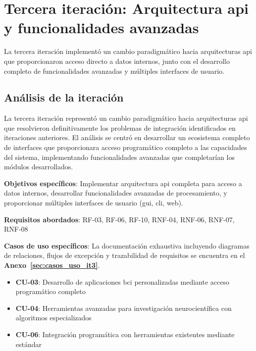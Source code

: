 \section{Tercera iteración: Arquitectura \acrshort{api} y funcionalidades avanzadas}
\label{sec:iteracion_3}

La tercera iteración implementó un cambio paradigmático hacia arquitecturas \acrshort{api} que proporcionaron acceso directo a datos internos, junto con el desarrollo completo de funcionalidades avanzadas y múltiples interfaces de usuario.

\subsection{Análisis de la iteración}
\label{subsec:analisis_iteracion_3}

La tercera iteración representó un cambio paradigmático hacia arquitecturas \acrshort{api} que resolvieron definitivamente los problemas de integración identificados en iteraciones anteriores. El análisis se centró en desarrollar un ecosistema completo de interfaces que proporcionara acceso programático completo a las capacidades del sistema, implementando funcionalidades avanzadas que completarían los módulos desarrollados.

\textbf{Objetivos específicos}: Implementar arquitectura \acrshort{api} completa para acceso a datos internos, desarrollar funcionalidades avanzadas de procesamiento, y proporcionar múltiples interfaces de usuario (\acrshort{gui}, \acrshort{cli}, web).

\textbf{Requisitos abordados}: RF-03, RF-06, RF-10, RNF-04, RNF-06, RNF-07, RNF-08

\textbf{Casos de uso específicos}: La documentación exhaustiva incluyendo diagramas de relaciones, flujos de excepción y trazabilidad de requisitos se encuentra en el \textbf{Anexo~\ref{sec:casos_uso_it3}}.
\begin{itemize}
    \item \textbf{CU-03}: Desarrollo de aplicaciones \acrshort{bci} personalizadas mediante acceso programático completo
    \item \textbf{CU-04}: Herramientas avanzadas para investigación neurocientífica con algoritmos especializados
    \item \textbf{CU-06}: Integración programática con herramientas existentes mediante  estándar
\end{itemize}

